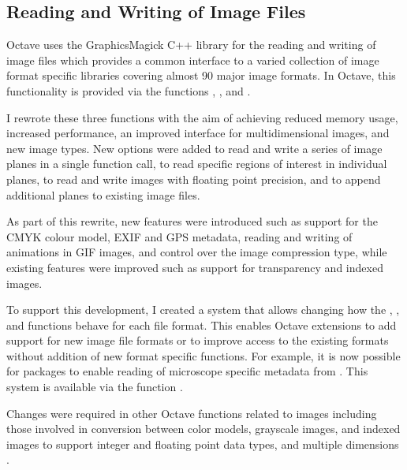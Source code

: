 \subsection{Reading and Writing of Image Files}

Octave uses the GraphicsMagick C++ library for the reading and writing
of image files which provides a common interface
to a varied collection of
image format specific libraries covering almost
90 major image formats.  In Octave, this functionality is
provided via the functions , , and
.

I rewrote these three functions with the aim of achieving
reduced memory usage, increased performance, an improved
interface for multidimensional images, and new image types.
New options were added to read and write a series of image planes
in a single function call, to read specific regions of interest in
individual planes, to read and write images
with floating point precision, and to append additional planes to existing image
files.

As part of this rewrite, new features were introduced such as
support for the CMYK colour model, EXIF
and GPS metadata, reading and writing of animations in GIF images, and
control over the image compression type,
while existing features were improved such as
support for transparency and
indexed images.

To support this development, I created a system that allows changing
how the , , and 
functions behave for each file format.
This enables Octave extensions to add support for new image file
formats or to improve access to the existing formats
without addition of new format specific functions.
For example, it is now possible for packages to enable reading of
microscope specific metadata from .
This system is available via the function .

Changes were required in other Octave functions related to images
including those involved in conversion between color
models, grayscale images, and indexed images to support integer and
floating point data types, and multiple dimensions
.


